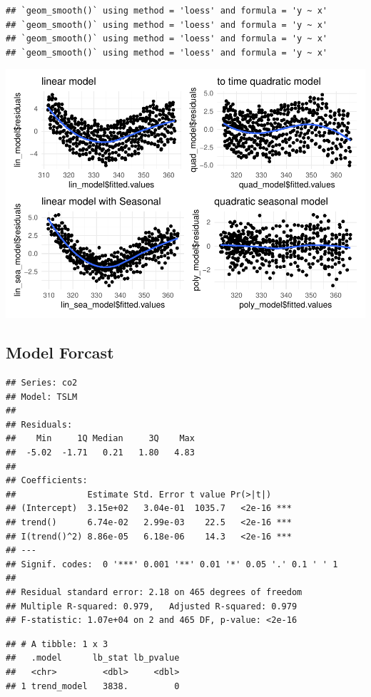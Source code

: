 \documentclass[AER]{AEA}
\begin{document}
\begin{verbatim}
## `geom_smooth()` using method = 'loess' and formula = 'y ~ x'
## `geom_smooth()` using method = 'loess' and formula = 'y ~ x'
## `geom_smooth()` using method = 'loess' and formula = 'y ~ x'
## `geom_smooth()` using method = 'loess' and formula = 'y ~ x'
\end{verbatim}

\includegraphics{Lab2_Group_report_files/figure-latex/unnamed-chunk-7-1.pdf}

\hypertarget{model-forcast}{%
\subsection{Model Forcast}\label{model-forcast}}

\begin{verbatim}
## Series: co2 
## Model: TSLM 
## 
## Residuals:
##    Min     1Q Median     3Q    Max 
##  -5.02  -1.71   0.21   1.80   4.83 
## 
## Coefficients:
##              Estimate Std. Error t value Pr(>|t|)    
## (Intercept)  3.15e+02   3.04e-01  1035.7   <2e-16 ***
## trend()      6.74e-02   2.99e-03    22.5   <2e-16 ***
## I(trend()^2) 8.86e-05   6.18e-06    14.3   <2e-16 ***
## ---
## Signif. codes:  0 '***' 0.001 '**' 0.01 '*' 0.05 '.' 0.1 ' ' 1
## 
## Residual standard error: 2.18 on 465 degrees of freedom
## Multiple R-squared: 0.979,   Adjusted R-squared: 0.979
## F-statistic: 1.07e+04 on 2 and 465 DF, p-value: <2e-16
\end{verbatim}

\begin{verbatim}
## # A tibble: 1 x 3
##   .model      lb_stat lb_pvalue
##   <chr>         <dbl>     <dbl>
## 1 trend_model   3838.         0
\end{verbatim}
\end{document}
